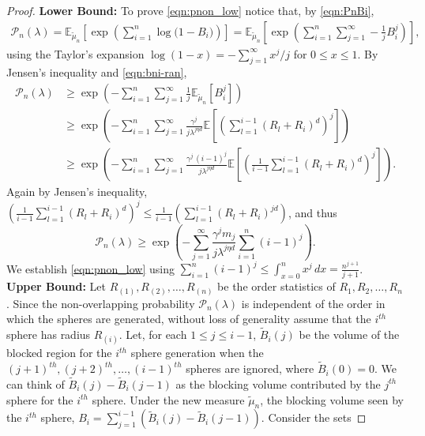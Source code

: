 \documentclass[11pt]{article}
\newcommand{\mbb}{\mathbb}
\newcommand{\lt}{\left}
\newcommand{\rt}{\right}
\newcommand{\wt}{\widetilde}
\newcommand{\pnon}{\mathcal{P}_n(\lambda)}
\begin{document}
\begin{appendices}
\begin{proof}
{\bf Lower Bound:} To prove \eqref{eqn:pnon_low} notice that,  by \eqref{eqn:PnBi},
\begin{align*}
 \pnon  = {\mbb E}_{\wt \mu_n}\left[\exp\lt( \sum_{i=1}^{n}\log \Big(1 - B_{i}\Big)\rt)\right]
        = {\mbb E}_{\wt \mu_n}\left[\exp\lt( \sum_{i=1}^{n}\sum_{j = 1}^\infty - \frac{1}{j}B_{i}^j\rt)\right],
\end{align*}
{using} the Taylor's expansion $\log(1 - x) = - \sum_{j =1}^\infty x^j/j$ for $0 \leq x \leq 1$. By Jensen's inequality and \eqref{eqn:bni-ran}, 
\begin{align*}
\pnon  &\ge \exp\left( - \sum_{i=1}^{n}\sum_{j = 1}^\infty \frac{1}{j}{\mbb E}_{\wt \mu_n}\left[B_{i}^j\right]\right)\nonumber\\
       &\geq \exp\left( - \sum_{i=1}^{n}\sum_{j = 1}^\infty \frac{\gamma^j\, }{j\lambda^{j\eta d}}{\mbb E}\left[\lt(\sum_{l = 1}^{i-1} \lt(R_l + R_{i}\rt)^{d}\rt)^j\right]\right)\nonumber\\
       &{\geq \exp\left( - \sum_{i=1}^{n}\sum_{j = 1}^\infty \frac{\gamma^j\, (i-1)^j}{j\lambda^{j\eta d}}{\mbb E}\left[\lt(\frac{1}{i-1}\sum_{l = 1}^{i-1} \lt(R_l + R_{i}\rt)^{d}\rt)^j\right]\right).}\nonumber
\end{align*}
Again by Jensen's inequality, $\lt(\frac{1}{i -1}\sum_{l = 1}^{i-1} \lt(R_l + R_{i}\rt)^{d}\rt)^j \leq \frac{1}{i-1}\lt(\sum_{l = 1}^{i-1} \lt(R_l + R_{i}\rt)^{jd}\rt)$,
and thus $$\pnon  \ge \exp\left( - \sum_{j = 1}^\infty \frac{\gamma^j m_j}{j\lambda^{j\eta d}}\sum_{i=1}^{n}(i-1)^j\right).$$
We establish \eqref{eqn:pnon_low} using $\sum_{i=1}^{n} (i-1)^j \leq \int_{x=0}^n x^j\, dx= \frac{n^{j+1}}{j+1}$.\\

\noindent
{\bf Upper Bound:}
Let $R_{(1)}, R_{(2)}, \dots, R_{(n)}$ be the order statistics of $R_1, R_2, \dots, R_n$. Since the non-overlapping probability $\pnon$ is independent of the order in which the spheres are generated, without loss of generality assume that the $i^{th}$ sphere has radius $R_{(i)}$.
Let, for each $1 \leq j \leq i -1$, $\wt{B}_i(j)$ be the volume of the blocked region for the $i^{th}$ sphere generation when the $(j+1)^{th}, (j+2)^{th}, \dots, (i -1)^{th}$ spheres are ignored,
where $\wt{B}_i(0) = 0$. We can think of $\wt{B}_i(j) - \wt{B}_i({j-1})$ as the blocking volume contributed by the $j^{th}$ sphere for the $i^{th}$ sphere.
Under the new measure $\wt \mu_n$, the blocking volume seen by the $i^{th}$ sphere, $\displaystyle B_{i} = \sum_{j = 1}^{i-1} \lt(\wt{B}_i(j) - \wt{B}_i({j-1})\rt).$
Consider the sets 


\end{proof}
\end{appendices}
\end{document}
